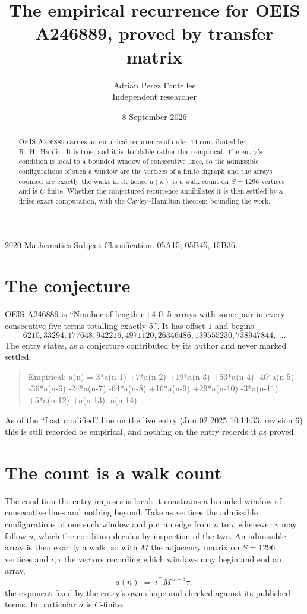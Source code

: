 \documentclass[11pt,a4paper]{article}
\title{The empirical recurrence for OEIS A246889, proved by transfer matrix}
\author{Adrian Perez Fontelles\\ \small Independent researcher}
\date{8 September 2026}
\theoremstyle{plain}
\theoremstyle{definition}
\begin{document}
\maketitle

\begin{abstract}
OEIS A246889 carries an empirical recurrence of order $14$ contributed by R.~H.~Hardin. It is
true, and it is decidable rather than empirical. The entry's condition is local to a bounded window of consecutive lines, so
the admissible configurations of such a window are the vertices of a finite digraph and the
arrays counted are exactly the walks in it; hence $a(n)$ is a walk count on $S=1296$ vertices
and is $C$-finite. Whether the conjectured recurrence annihilates it is then settled by a
finite exact computation, with the Cayley--Hamilton theorem bounding the work.
\end{abstract}

\noindent\small 2020 Mathematics Subject Classification. 05A15, 05B45, 15B36.\normalsize

\section{The conjecture}

OEIS A246889 is ``Number of length n+4 0..5 arrays with some pair in every consecutive five terms totalling exactly 5.''. It has offset $1$ and begins
\[
6210, 33294, 177648, 942216, 4971120, 26346486, 139555230, 738947844,\ \dots
\]
The entry states, as a conjecture contributed by its author and never marked settled:
\begin{quote}
Empirical: a(n) = 3*a(n-1) +7*a(n-2) +19*a(n-3) +53*a(n-4) -40*a(n-5) -36*a(n-6) -24*a(n-7) -64*a(n-8) +16*a(n-9) +29*a(n-10) -3*a(n-11) +5*a(n-12) +a(n-13) -a(n-14)
\end{quote}
As of the ``Last modified'' line on the live entry (Jun 02 2025 10:14:33, revision 6) this is still
recorded as empirical, and nothing on the entry records it as proved.

\section{The count is a walk count}

The condition the entry imposes is local: it constrains a bounded window of consecutive lines and nothing beyond. Take as
vertices the admissible configurations of one such window and put an edge from $u$ to $v$
whenever $v$ may follow $u$, which the condition decides by inspection of the two. An
admissible array is then exactly a walk, so with $M$ the adjacency matrix on $S=1296$ vertices
and $\iota,\tau$ the vectors recording which windows may begin and end an array,
\[
a(n)\;=\;\iota^{\!\top}M^{\,n+3}\tau ,
\]
the exponent fixed by the entry's own shape and checked against its published terms. In
particular $a$ is $C$-finite.
\end{document}
